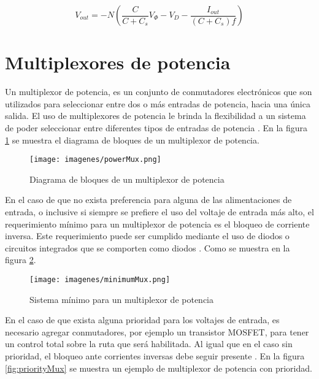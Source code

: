     \begin{equation}
        V_{out} = - N \left (  \frac{C}{C+C_s}V_\Phi - V_D - 
        \frac{I_{out}}{(C+C_s)f} \right )
        \label{eq:dickson_charge_neg}
    \end{equation}


\section{Multiplexores de potencia}

Un multiplexor de potencia, es un conjunto de conmutadores electrónicos que son utilizados
para seleccionar entre dos o más entradas de potencia, hacia una única salida. El uso de 
multiplexores de potencia le brinda la flexibilidad a un sistema de poder seleccionar
entre diferentes tipos de entradas de potencia \cite{triano_basics_2020}. En la figura 
\ref{fig:powerMux} se muestra el diagrama de bloques de un multiplexor de potencia.


\begin{figure}[H]
    \centering
    \texttt{[image: imagenes/powerMux.png]}
    \caption{Diagrama de bloques de un multiplexor de potencia \cite{triano_basics_2020}}
    \label{fig:powerMux}
\end{figure}


En el caso de que no exista preferencia para alguna de las alimentaciones de entrada, o inclusive
si siempre se prefiere el uso del voltaje de entrada más alto, el requerimiento mínimo para un multiplexor
de potencia es el bloqueo de corriente inversa. Este requerimiento puede ser cumplido mediante el uso de 
diodos o circuitos integrados que se comporten como diodos \cite{triano_basics_2020}.  Como se muestra en la figura \ref{fig:muxDiode}.

\begin{figure}[H]
    \centering
    \texttt{[image: imagenes/minimumMux.png]}
    \caption{Sistema mínimo para un multiplexor de potencia \cite{triano_basics_2020}}
    \label{fig:muxDiode}
\end{figure}

En el caso de que exista alguna prioridad para los voltajes de entrada, es necesario agregar conmutadores,
por ejemplo un transistor MOSFET, para tener un control total sobre la ruta que será habilitada. Al igual que
en el caso sin prioridad, el bloqueo ante corrientes inversas debe seguir presente \cite{triano_basics_2020}. En la figura \ref{fig:priorityMux} se muestra un ejemplo de multiplexor de potencia con prioridad.

